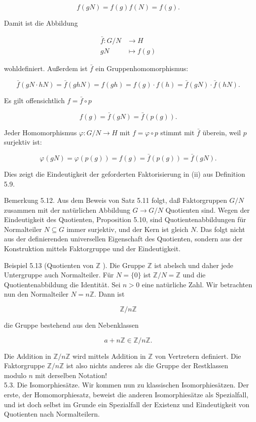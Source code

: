 \documentclass[10pt, letterpaper]{article}
\begin{document}
$$
f(g N)=f(g) f(N)=f(g) .
$$

Damit ist die Abbildung

$$
\begin{aligned}
\bar{f}: G / N & \rightarrow H \\
g N & \mapsto f(g)
\end{aligned}
$$

wohldefiniert. Außerdem ist $\bar{f}$ ein Gruppenhomomorphismus:

$$
\bar{f}(g N \cdot h N)=\bar{f}(g h N)=f(g h)=f(g) \cdot f(h)=\bar{f}(g N) \cdot \bar{f}(h N) .
$$

Es gilt offensichtlich $f=\bar{f} \circ p$

$$
f(g)=\bar{f}(g N)=\bar{f}(p(g)) .
$$

Jeder Homomorphismus $\varphi: G / N \rightarrow H$ mit $f=\varphi \circ p$ stimmt mit $\bar{f}$ überein, weil $p$ surjektiv ist:

$$
\varphi(g N)=\varphi(p(g))=f(g)=\bar{f}(p(g))=\bar{f}(g N) .
$$

Dies zeigt die Eindeutigkeit der geforderten Faktorisierung in (ii) aus Definition 5.9.

Bemerkung 5.12. Aus dem Beweis von Satz 5.11 folgt, daß Faktorgruppen $G / N$ zusammen mit der natürlichen Abbildung $G \rightarrow G / N$ Quotienten sind. Wegen der Eindeutigkeit des Quotienten, Proposition 5.10, sind Quotientenabbildungen für Normalteiler $N \subseteq G$ immer surjektiv, und der Kern ist gleich $N$. Das folgt nicht aus der definierenden universellen Eigenschaft des Quotienten, sondern aus der Konstruktion mittels Faktorgruppe und der Eindeutigkeit.

Beispiel 5.13 (Quotienten von $\mathbb{Z}$ ). Die Gruppe $\mathbb{Z}$ ist abelsch und daher jede Untergruppe auch Normalteiler. Für $N=\{0\}$ ist $\mathbb{Z} / N=\mathbb{Z}$ und die Quotientenabbildung die Identität. Sei $n>0$ eine natürliche Zahl. Wir betrachten nun den Normalteiler $N=n \mathbb{Z}$. Dann ist

$$
\mathbb{Z} / n \mathbb{Z}
$$

die Gruppe bestehend aus den Nebenklassen

$$
a+n \mathbb{Z} \in \mathbb{Z} / n \mathbb{Z} .
$$

Die Addition in $\mathbb{Z} / n \mathbb{Z}$ wird mittels Addition in $\mathbb{Z}$ von Vertretern definiert. Die Faktorgruppe $\mathbb{Z} / n \mathbb{Z}$ ist also nichts anderes als die Gruppe der Restklassen modulo $n$ mit derselben Notation!\\
5.3. Die Isomorphiesätze. Wir kommen nun zu klassischen Isomorphiesätzen. Der erste, der Homomorphiesatz, beweist die anderen Isomorphiesätze als Spezialfall, und ist doch selbst im Grunde ein Spezialfall der Existenz und Eindeutigkeit von Quotienten nach Normalteilern.
\end{document}
